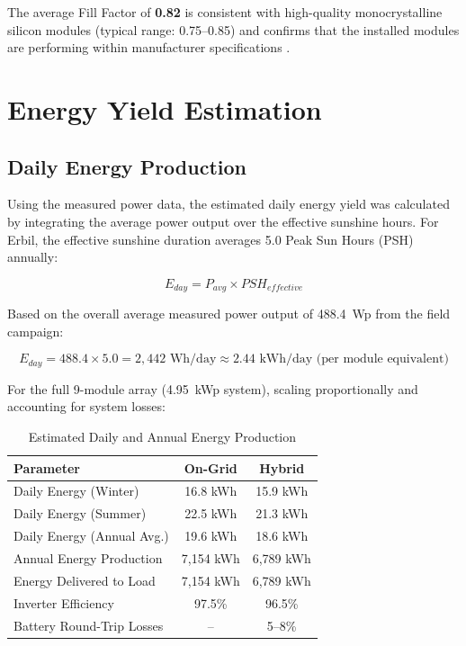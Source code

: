 The average Fill Factor of \textbf{0.82} is consistent with high-quality monocrystalline silicon modules (typical range: 0.75--0.85) and confirms that the installed modules are performing within manufacturer specifications \cite{green2022}.


\section{Energy Yield Estimation}

\subsection{Daily Energy Production}

Using the measured power data, the estimated daily energy yield was calculated by integrating the average power output over the effective sunshine hours. For Erbil, the effective sunshine duration averages 5.0 Peak Sun Hours (PSH) annually:

\begin{equation}
    E_{day} = P_{avg} \times PSH_{effective}
    \label{eq:daily_energy}
\end{equation}

Based on the overall average measured power output of 488.4~Wp from the field campaign:

\begin{equation}
    E_{day} = 488.4 \times 5.0 = 2{,}442 \text{~Wh/day} \approx 2.44 \text{~kWh/day (per module equivalent)}
\end{equation}

For the full 9-module array (4.95~kWp system), scaling proportionally and accounting for system losses:

\begin{table}[H]
\centering
\caption{Estimated Daily and Annual Energy Production}
\label{tab:energy_production}
\begin{tabular}{@{}p{5cm} c c@{}}
\toprule
\textbf{Parameter} & \textbf{On-Grid} & \textbf{Hybrid} \\
\midrule
Daily Energy (Winter) & 16.8 kWh & 15.9 kWh \\
Daily Energy (Summer) & 22.5 kWh & 21.3 kWh \\
Daily Energy (Annual Avg.) & 19.6 kWh & 18.6 kWh \\
Annual Energy Production & 7,154 kWh & 6,789 kWh \\
Energy Delivered to Load & 7,154 kWh & 6,789 kWh \\
Inverter Efficiency & 97.5\% & 96.5\% \\
Battery Round-Trip Losses & -- & 5--8\% \\
\bottomrule
\end{tabular}
\end{table}

